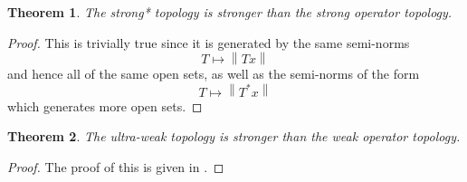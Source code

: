 \documentclass{article}
\theoremstyle{plain}
\newtheorem{theorem}{Theorem}
\theoremstyle{definition}
\newcommand{\norm}[1]{\left\lVert #1 \right\rVert}
\begin{document}
                \begin{theorem}
                        The strong* topology is stronger than the strong operator topology.
                \end{theorem}
                \begin{proof}
                        This is trivially true since it is generated by the same semi-norms
                                $$T \mapsto \norm{Tx}$$
                        and hence all of the same open sets, as well as the semi-norms of the form 
                                $$T \mapsto \norm{T^*x}$$
                        which generates more open sets.
                \end{proof}
                
                \begin{theorem}
                        The ultra-weak topology is stronger than the weak operator topology.
                \end{theorem}
                \begin{proof}
                        The proof of this is given in \cite{cycr}.
                \end{proof}
                
\end{document}

